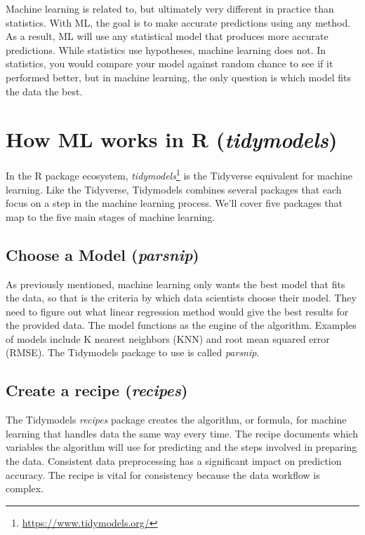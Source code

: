 \documentclass[
  krantz2]{krantz}
\begin{document}
Machine learning is related to, but ultimately very different in practice than statistics. With ML, the goal is to make accurate predictions using any method. As a result, ML will use any statistical model that produces more accurate predictions. While statistics use hypotheses, machine learning does not. In statistics, you would compare your model against random chance to see if it performed better, but in machine learning, the only question is which model fits the data the best.

\hypertarget{ml-r}{%
\section{\texorpdfstring{How ML works in R (\emph{tidymodels})}{How ML works in R (tidymodels)}}\label{ml-r}}

In the R package ecosystem, \emph{tidymodels}\footnote{\url{https://www.tidymodels.org/}} is the Tidyverse equivalent for machine learning. Like the Tidyverse, Tidymodels combines several packages that each focus on a step in the machine learning process. We'll cover five packages that map to the five main stages of machine learning.

\hypertarget{choose-a-model-parsnip}{%
\subsection{\texorpdfstring{Choose a Model (\emph{parsnip})}{Choose a Model (parsnip)}}\label{choose-a-model-parsnip}}

As previously mentioned, machine learning only wants the best model that fits the data, so that is the criteria by which data scientists choose their model. They need to figure out what linear regression method would give the best results for the provided data. The model functions as the engine of the algorithm. Examples of models include K nearest neighbors (KNN) and root mean squared error (RMSE). The Tidymodels package to use is called \emph{parsnip}.

\hypertarget{create-a-recipe-recipes}{%
\subsection{\texorpdfstring{Create a recipe (\emph{recipes})}{Create a recipe (recipes)}}\label{create-a-recipe-recipes}}

The Tidymodels \emph{recipes} package creates the algorithm, or formula, for machine learning that handles data the same way every time. The recipe documents which variables the algorithm will use for predicting and the steps involved in preparing the data. Consistent data preprocessing has a significant impact on prediction accuracy. The recipe is vital for consistency because the data workflow is complex.
\end{document}
